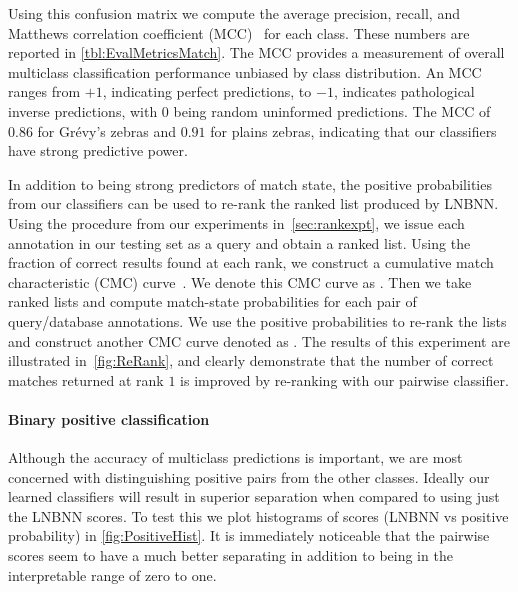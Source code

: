         Using this confusion matrix we compute the average precision, recall, and Matthews correlation
          coefficient (MCC)~\cite{powers_evaluation_2011} for each class.
        These numbers are reported in \cref{tbl:EvalMetricsMatch}.
        The MCC provides a measurement of overall multiclass classification performance unbiased by class
          distribution.
        An MCC ranges from $+1$, indicating perfect predictions, to $-1$, indicates pathological inverse
          predictions, with $0$ being random uninformed predictions.
        The MCC of $0.86$ for Grévy's zebras and $0.91$ for plains zebras, indicating that our classifiers have
          strong predictive power.

        \ConfusionMatch{}

        \EvalMetricsMatch{}

        In addition to being strong predictors of match state, the positive probabilities from our classifiers
          can be used to re-rank the ranked list produced by LNBNN.
        Using the procedure from our experiments in~\cref{sec:rankexpt}, we issue each annotation in our testing
          set as a query and obtain a ranked list.
        Using the fraction of correct results found at each rank, we construct a cumulative match characteristic
          (CMC) curve~\cite{decann_relating_2013}.
        We denote this CMC curve as .
        Then we take ranked lists and compute match-state probabilities for each pair of query/database
          annotations.
        We use the positive probabilities to re-rank the lists and construct another CMC curve denoted as
          .
        The results of this experiment are illustrated in~\cref{fig:ReRank}, and clearly demonstrate that the
          number of correct matches returned at rank $1$ is improved by re-ranking with our pairwise classifier.
        

        \ReRank{}
        
        \FloatBarrier{}
        \paragraph{Binary positive classification}
        Although the accuracy of multiclass predictions is important, we are most concerned with distinguishing
          positive pairs from the other classes.
        Ideally our learned classifiers will result in superior separation when compared to using just the LNBNN
          scores.
        To test this we plot histograms of scores (LNBNN vs positive probability) in \cref{fig:PositiveHist}.
        It is immediately noticeable that the pairwise scores seem to have a much better separating in addition
          to being in the interpretable range of zero to one.

